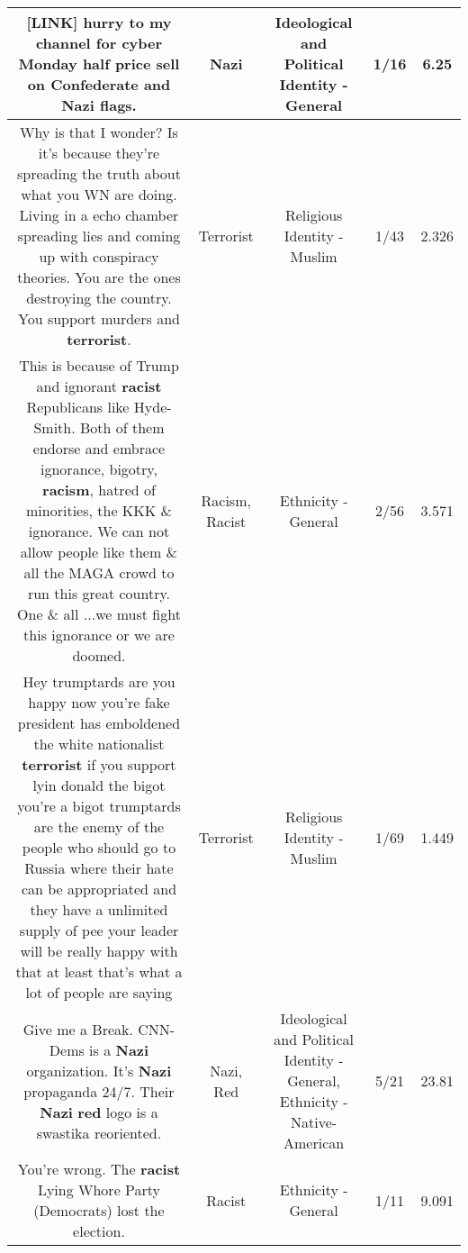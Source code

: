 \documentclass[11pt]{article}
\newlength\mylength
\begin{document}
\begin{center}
\begin{longtable}{|C{.65\mylength}|C{.30\mylength}|C{.12\mylength}|C{.12\mylength}|C{.12\mylength}|}
  \small  [LINK]  hurry to my channel for cyber Monday half price sell on Confederate and \textbf{Nazi} flags.\normalsize   & Nazi &  Ideological and Political Identity - General & 1/16 & 6.25 \\  \hline
  \small Why is that I wonder? Is it's because they're spreading the truth about what you WN are doing. Living in a echo chamber spreading lies and coming up with conspiracy theories. You are the ones destroying the country. You support murders and \textbf{terrorist}.\normalsize   & Terrorist & Religious Identity - Muslim & 1/43 & 2.326 \\  \hline
  \small This is because of Trump and ignorant \textbf{racist} Republicans like Hyde-Smith. Both of them endorse and embrace ignorance, bigotry, \textbf{racism}, hatred of minorities, the KKK  \& ignorance. We can not allow  people like them \& all the MAGA crowd to run this great country.  One \&  all ...we must fight this ignorance or we are doomed.\normalsize   & Racism, Racist & Ethnicity - General & 2/56 & 3.571 \\  \hline
  \small Hey trumptards are you happy now you're fake president has emboldened the white nationalist \textbf{terrorist} if you support lyin donald the bigot you're a bigot trumptards are the enemy of the people who should go to Russia where their hate can be appropriated and they have a unlimited supply of pee your leader will be really happy with that at least that's what a lot of people are saying\normalsize   & Terrorist & Religious Identity - Muslim & 1/69 & 1.449 \\  \hline
  \small Give me a Break. CNN-Dems is a \textbf{Nazi} organization. It's \textbf{Nazi} propaganda 24/7. Their \textbf{Nazi} \textbf{r\textbf{ed}} logo is a swastika reoriented.\normalsize   & Nazi, Red &  Ideological and Political Identity - General, Ethnicity - Native-American & 5/21 & 23.81 \\  \hline
  \small You're wrong. The \textbf{racist} Lying Whore Party (Democrats) lost the election.\normalsize   & Racist & Ethnicity - General & 1/11 & 9.091 \\  \hline

\end{longtable}
\end{center}
\end{document}
